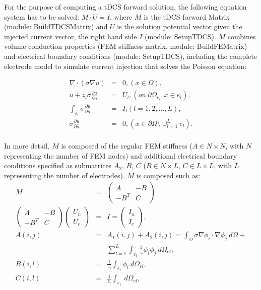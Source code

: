 \documentclass[fleqn,11pt,openany]{book}
\begin{document}
For the purpose of computing a tDCS forward solution, the following equation system has to be solved: $M \cdot U = I$, where $M$ is the tDCS forward Matrix (module: BuildTDCSMatrix) and $U$ is the solution potential vector given the injected current vector, the right hand side $I$
(module: SetupTDCS). $M$ combines volume conduction properties (FEM stiffness matrix, module: BuildFEMatrix) and electrical boundary conditions (module: SetupTDCS), including the complete electrode model to simulate current injection
that solves the Poisson equation:

\begin{center}
\begin{eqnarray*}
     \nabla \cdot (\sigma \nabla u) & = & 0 ,(x \in \Omega), \\
     u + z_{l} \sigma \frac{\partial u}{\partial n} & = & 
     U_{l} , (on\ \partial \Omega_{e_{l}},x \in e_{l}),\\ 
     \int_{e_{l}} \sigma \frac{\partial u}{\partial n} & = & 
     I_{l} (l = 1,2,...,L), \\
      \sigma \frac{\partial u}{\partial n} & = & 
      0, (x \in \partial \Omega \setminus  \cup^{L}_{l=1} e_{l}). \\
\end{eqnarray*}
\end{center}

In more detail, $M$ is composed of the regular FEM stiffness ($A \in N \times N$, with $N$ representing the number of FEM nodes) and additional electrical boundary conditions specified as submatrices $A_{2}$,
$B$, $C$ ($B \in N \times L$, $C \in L \times L$, with $L$ representing the number of electrodes).
$M$ is composed such as: \\

\begin{eqnarray}
M &=& \left( \begin{array}{cc}
A & -B \\
-B^{T} & C
\end{array} \right) \nonumber \\
\left( \begin{array}{cc}
A & -B \\
-B^{T} & C
\end{array} \right) 
\left(
\begin{array}{c}
U_{n} \\
U_{e}
\end{array}
\right) &=& I =
\left(
\begin{array}{c}
I_{n} \\
I_{e}
\end{array}
\right) \nonumber, \\
A(i,j) &=& A_{1}(i,j) + A_{2}(i,j) = \int_{\Omega} \sigma \nabla \phi_{i} \cdot \nabla
\phi_{j}\ d\Omega + \nonumber \\
& & \sum_{l=1}^{L} \int_{e_{l}} \frac{1}{z_l} \phi_{i}
\phi_{j}\ d\Omega_{el}, \nonumber \\
B(i,l) &=& \frac{1}{z_{l}} \int_{e_l} \phi_{i}\ d\Omega_{el}
\nonumber, \\
C(i,l) &=& \frac{1}{z_{l}} \int_{e_l}\ d\Omega_{el}, \nonumber \\ \nonumber \\
\end{eqnarray}
\end{document}
